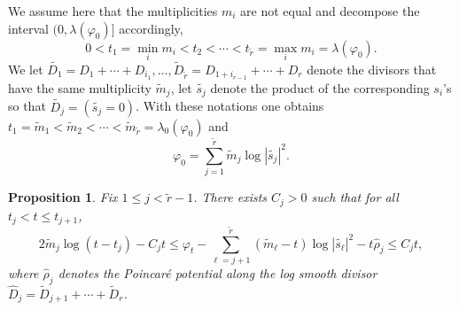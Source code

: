 \documentclass[11pt]{amsart}
\numberwithin{equation}{section}
\newtheorem{prop}[theorem]{Proposition}
\newcommand{\f}{\varphi}
\newcommand \la {\lambda}
\begin{document}
We assume here that the multiplicities $m_i$ are not equal and decompose 
the interval $(0,\la(\f_0)]$ accordingly,
$$
0<t_1=\min_i m_i <t_2 < \cdots <t_{\tilde{r}}=\max_i m_i=\la(\f_0).
$$
We let
$\tilde{D_1}=D_1 + \cdots + D_{i_1}, \ldots, \tilde{D}_{\tilde{r}}=D_{1+i_{{r}-1}} + \cdots + D_{r}$
denote the divisors that have the same multiplicity $\tilde{m}_j$,
let $\tilde{s_j}$ denote the product of the corresponding $s_i$'s so that
$\tilde{D_j}=(\tilde{s_j}=0)$.
With these notations one obtains
$t_1=\tilde{m}_1< \tilde{m}_2 < \cdots <\tilde{m}_{\tilde r}=\la_0(\f_0)$ and
$$
\f_0=\sum_{j=1}^{\tilde{r}} \tilde{m}_j \log |\tilde{s_j}|^2.
$$

\begin{prop} \label{prop:0uniform2}
Fix $1 \leq j < {\tilde r}-1$.
There exists $C_j>0$ such that for all $t_j <t \leq t_{j+1}$,
$$
2 \tilde{m}_j \log (t-t_j) -C_j t \leq 
\f_t -\sum_{\ell=j+1}^{\tilde{r}} (\tilde{m}_{\ell}-t) \log |\tilde{s_\ell}|^2 -t \hat{\rho}_j 
\leq C_j t,
$$
where $\hat{\rho}_j$ denotes the Poincaré potential along the log smooth divisor 
$\hat{D}_j=\tilde{D}_{j+1} + \cdots + \tilde{D}_r$.

\end{prop}
\end{document}

